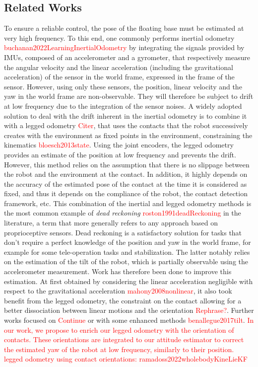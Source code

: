 \documentclass{IJCAS}
\begin{document}
\subsection{Related Works}
    To ensure a reliable control, the pose of the floating base must be estimated at very high frequency. To this end, one commonly performs inertial odometry \textcolor{red}{buchanan2022LearningInertialOdometry} by integrating the signals provided by IMUs, composed of an accelerometer and a gyrometer, that respectively measure the angular velocity and the linear acceleration (including the gravitational acceleration) of the sensor in the world frame, expressed in the frame of the sensor. However, using only these sensors, the position, linear velocity and the yaw in the world frame are non-observable. They will therefore be subject to drift at low frequency due to the integration of the sensor noises. 
    A widely adopted solution to deal with the drift inherent in the inertial odometry is to combine it with a legged odometry \textcolor{red}{Citer}, that uses the contacts that the robot successively creates with the environment as fixed points in the environment, constraining the kinematics \textcolor{red}{bloesch2013state}. Using the joint encoders, the legged odometry provides an estimate of the position at low frequency and prevents the drift. However, this method relies on the assumption that there is no slippage between the robot and the environment at the contact. In addition, it highly depends on the accuracy of the estimated pose of the contact at the time it is considered as fixed, and thus it depends on the compliance of the robot, the contact detection framework, etc. This combination of the inertial and legged odometry methods is the most common example of \emph{dead reckoning} \textcolor{red}{roston1991deadReckoning} in the literature, a term that more generally refers to any approach based on proprioceptive sensors. Dead reckoning is a satisfactory solution for tasks that don't require a perfect knowledge of the position and yaw in the world frame, for example for some tele-operation tasks and stabilization. The latter notably relies on the estimation of the tilt of the robot, which is partially observable using the accelerometer measurement. Work has therefore been done to improve this estimation. At first obtained by considering the linear acceleration negligible with respect to the gravitational acceleration \textcolor{red}{mahony2008nonlinear}, it also took benefit from the legged odometry, the constraint on the contact allowing for a better dissociation between linear motions and the orientation \textcolor{red}{Rephrase?}. Further works focused on \textcolor{red}{Continue} or with some enhanced methods \textcolor{red}{benallegue2017tilt}. \textcolor{red}{In our work, we propose to enrich our legged odometry with the orientation of contacts. These orientations are integrated to our attitude estimator to correct the estimated yaw of the robot at low frequency, similarly to their position.}
    \textcolor{red}{legged odometry using contact orientations: ramadoss2022wholebodyKineLieKF}
    
\end{document}
